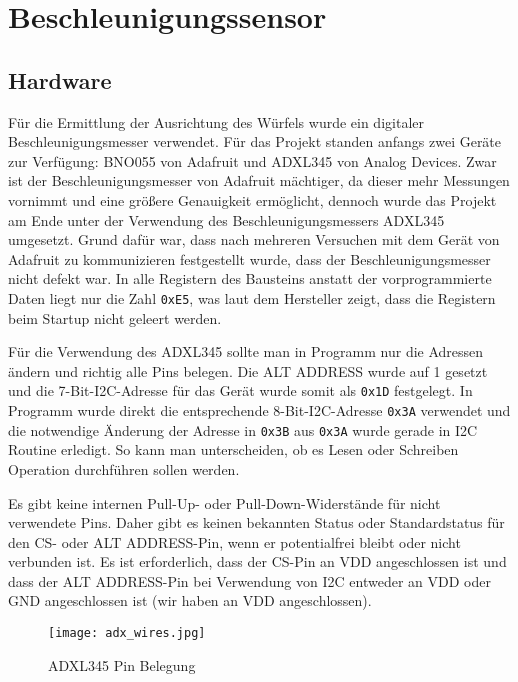 
\section{Beschleunigungssensor}
\subsection{Hardware}
Für die Ermittlung der Ausrichtung des Würfels wurde ein digitaler Beschleunigungsmesser verwendet. Für das Projekt standen anfangs zwei Geräte zur Verfügung: BNO055 von Adafruit und ADXL345 von Analog Devices. Zwar ist der Beschleunigungsmesser von Adafruit mächtiger, da dieser mehr Messungen vornimmt und eine größere Genauigkeit ermöglicht, dennoch wurde das Projekt am Ende unter der Verwendung des Beschleunigungsmessers ADXL345 umgesetzt. Grund dafür war, dass nach mehreren Versuchen mit dem Gerät von Adafruit zu kommunizieren festgestellt wurde, dass der Beschleunigungsmesser nicht defekt war. In alle Registern des Bausteins anstatt der vorprogrammierte Daten liegt nur die Zahl \texttt{0xE5}, was laut dem Hersteller zeigt, dass die Registern beim Startup nicht geleert werden.

Für die Verwendung des ADXL345 sollte man in Programm nur die Adressen ändern und richtig alle Pins belegen. Die ALT ADDRESS wurde auf 1 gesetzt und die 7-Bit-I2C-Adresse für das Gerät wurde somit als \texttt{0x1D} festgelegt. In Programm wurde direkt die entsprechende 8-Bit-I2C-Adresse \texttt{0x3A} verwendet und die notwendige Änderung der Adresse in \texttt{0x3B} aus \texttt{0x3A} wurde gerade in I2C Routine erledigt. So kann man unterscheiden, ob es Lesen oder Schreiben Operation durchführen sollen werden. 

Es gibt keine internen Pull-Up- oder Pull-Down-Widerstände für nicht verwendete Pins. Daher gibt es keinen bekannten Status oder Standardstatus für den CS- oder ALT ADDRESS-Pin, wenn er potentialfrei bleibt oder nicht verbunden ist. Es ist erforderlich, dass der CS-Pin an VDD  angeschlossen ist und dass der ALT ADDRESS-Pin bei Verwendung von I2C entweder an VDD oder GND angeschlossen ist (wir haben an VDD angeschlossen).

\begin{figure}[!h]
	\centering
	\texttt{[image: adx\_wires.jpg]}
	\caption[AXL345 Pin Belegung]{ADXL345 Pin Belegung}
	\label{fig:i2cwires}
\end{figure}

